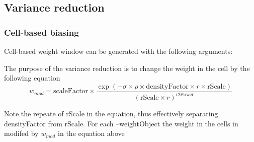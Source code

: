 \subsection{Variance reduction}
\subsubsection{Cell-based biasing}
\label{sec:vr:cell}

Cell-based weight window can be generated with the following arguments:





  The purpose of the variance reduction is to change the weight in the cell by the following equation 
  \begin{equation}
    \label{weigthEqn}
    w_{mod}= \textrm{scaleFactor} \times \frac{\exp (-\sigma \times \rho \times \textrm{densityFactor}
      \times r \times \textrm{rScale}) }
    { (\textrm{rScale} \times r )^{\textrm{r2Power}} }
  \end{equation}

  Note the repeate of rScale in the equation, thus effectively separating densityFactor from rScale.
  For each --weightObject the weight in the cells in modifed by $w_{mod}$ in the equation above 
  
